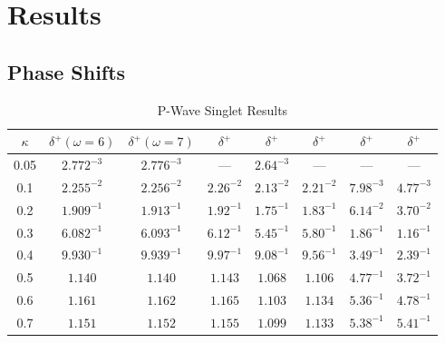 \documentclass[Dissertation.tex]{subfiles}
\begin{document}
\section{Results}

\subsection{Phase Shifts}

\begin{table}[H]
\begin{center}
\begin{tabular}{c | c c c c c c c}
\toprule
$\kappa$ & $\delta^+ (\omega = 6)$ & $\delta^+ (\omega = 7)$ & $\delta^+$ \cite{VanReethPrivate} & $\delta^+$ \cite{Blackwood2002} & $\delta^+$ \cite{Walters2004} & $\delta^+$ \cite{Ray1997} & $\delta^+$ \cite{Adhikari1999} \\
\midrule
0.05 & $2.772^{-3}$ & $2.776^{-3}$ & --- & $2.64^{-3}$ & --- & --- & --- \\
0.1 & $2.255^{-2}$ & $2.256^{-2}$ & $2.26^{-2}$ & $2.13^{-2}$ & $2.21^{-2}$ & $7.98^{-3}$ & $4.77^{-3}$ \\
0.2 & $1.909^{-1}$ & $1.913^{-1}$ & $1.92^{-1}$ & $1.75^{-1}$ & $1.83^{-1}$ & $6.14^{-2}$ & $3.70^{-2}$ \\
0.3 & $6.082^{-1}$ & $6.093^{-1}$ & $6.12^{-1}$ & $5.45^{-1}$ & $5.80^{-1}$ & $1.86^{-1}$ & $1.16^{-1}$ \\
0.4 & $9.930^{-1}$ & $9.939^{-1}$ & $9.97^{-1}$ & $9.08^{-1}$ & $9.56^{-1}$ & $3.49^{-1}$ & $2.39^{-1}$ \\
0.5 & $1.140$ & $1.140$ & $1.143$ & $1.068$ & $1.106$ & $4.77^{-1}$ & $3.72^{-1}$ \\
0.6 & $1.161$ & $1.162$ & $1.165$ & $1.103$ & $1.134$ & $5.36^{-1}$ & $4.78^{-1}$ \\
0.7 & $1.151$ & $1.152$ & $1.155$ & $1.099$ & $1.133$ & $5.38^{-1}$ & $5.41^{-1}$ \\
\bottomrule
\end{tabular}
\caption{P-Wave Singlet Results}
\label{tab:PWaveSinglet}
\end{center}
\end{table}
\end{document}
